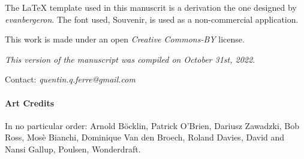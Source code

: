 The LaTeX template used in this manuscrit is a derivation the one designed by \textit{evanbergeron}. The font used, Souvenir, is used as a non-commercial application.

\vskip 0.5cm

This work is made under an open \textit{Creative Commons-BY} license. 

\textit{This version of the manuscript was compiled on October 31st, 2022.}

Contact: \textit{quentin.q.ferre@gmail.com}



\paragraph{Art Credits}

In no particular order: Arnold Böcklin, Patrick O'Brien, Dariusz Zawadzki, Bob Ross, Mosè Bianchi, Dominique Van den Broech, Roland Davies, David and Nansi Gallup, Poulsen, Wonderdraft.


